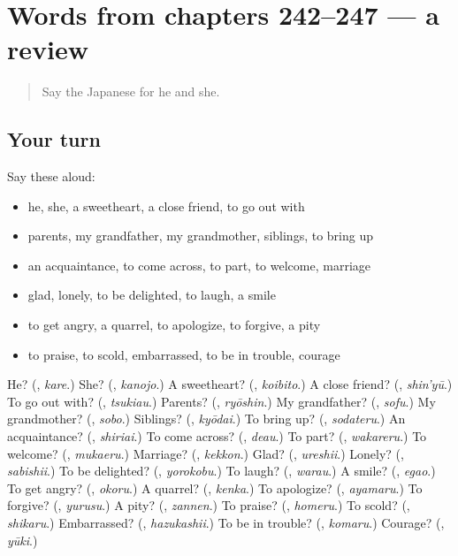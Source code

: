 \section[(dialogue)]{Words from chapters 242–247 — a review}

\label{lesson:JA-R247-review-242-247}



\begin{quote}
Say the Japanese for he and she.
\end{quote}

\subsection*{Your turn}
Say these aloud:

\begin{itemize}
\raggedright
  \item he, she, a sweetheart, a close friend, to go out with
  \item parents, my grandfather, my grandmother, siblings, to bring up
  \item an acquaintance, to come across, to part, to welcome, marriage
  \item glad, lonely, to be delighted, to laugh, a smile
  \item to get angry, a quarrel, to apologize, to forgive, a pity
  \item to praise, to scold, embarrassed, to be in trouble, courage
\end{itemize}

\begin{tcolorbox}[breakable,colback=teal!4,colframe=teal!35!black,title={Before you move on}]
He? (\textbf{}, \emph{kare}.) She? (\textbf{}, \emph{kanojo}.) A sweetheart? (\textbf{}, \emph{koibito}.) A close friend? (\textbf{}, \emph{shin'yū}.) To go out with? (\textbf{}, \emph{tsukiau}.) Parents? (\textbf{}, \emph{ryōshin}.) My grandfather? (\textbf{}, \emph{sofu}.) My grandmother? (\textbf{}, \emph{sobo}.) Siblings? (\textbf{}, \emph{kyōdai}.) To bring up? (\textbf{}, \emph{sodateru}.) An acquaintance? (\textbf{}, \emph{shiriai}.) To come across? (\textbf{}, \emph{deau}.) To part? (\textbf{}, \emph{wakareru}.) To welcome? (\textbf{}, \emph{mukaeru}.) Marriage? (\textbf{}, \emph{kekkon}.) Glad? (\textbf{}, \emph{ureshii}.) Lonely? (\textbf{}, \emph{sabishii}.) To be delighted? (\textbf{}, \emph{yorokobu}.) To laugh? (\textbf{}, \emph{warau}.) A smile? (\textbf{}, \emph{egao}.) To get angry? (\textbf{}, \emph{okoru}.) A quarrel? (\textbf{}, \emph{kenka}.) To apologize? (\textbf{}, \emph{ayamaru}.) To forgive? (\textbf{}, \emph{yurusu}.) A pity? (\textbf{}, \emph{zannen}.) To praise? (\textbf{}, \emph{homeru}.) To scold? (\textbf{}, \emph{shikaru}.) Embarrassed? (\textbf{}, \emph{hazukashii}.) To be in trouble? (\textbf{}, \emph{komaru}.) Courage? (\textbf{}, \emph{yūki}.)
\end{tcolorbox}
